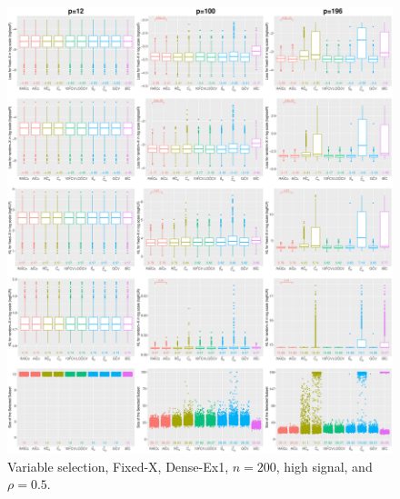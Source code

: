 \begin{figure}[!ht]
\centering
\includegraphics[width=\textwidth]{figures/supplement/fixedx/subset_selection/Dense-Ex1_n200_hsnr_rho05.eps}
\caption{Variable selection, Fixed-X, Dense-Ex1, $n=200$, high signal, and $\rho=0.5$.}
\end{figure}
\clearpage
